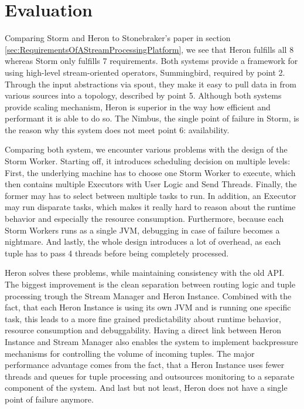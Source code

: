 \documentclass[conference]{IEEEtran}
\begin{document}
\section{Evaluation}
\label{sec:Evaluation}

Comparing Storm and Heron to Stonebraker's paper in section \ref{sec:RequirementsOfAStreamProcessingPlatform}, we see that Heron fulfills all 8 whereas Storm only fulfills 7 requirements.
Both systems provide a framework for using high-level stream-oriented operators, Summingbird, required by point 2.
Through the input abstractions via spout, they make it easy to pull data in from various sources into a topology, described by point 5.
Although both systems provide scaling mechanism, Heron is superior in the way how efficient and performant it is able to do so.
The Nimbus, the single point of failure in Storm, is the reason why this system does not meet point 6: availability.

Comparing both system, we encounter various problems with the design of the Storm Worker.
Starting off, it introduces scheduling decision on multiple levels: First, the underlying machine has to choose one Storm Worker to execute, which then contains multiple Executors with User Logic and Send Threads.
Finally, the former may has to select between multiple tasks to run.
In addition, an Executor may run disparate tasks, which makes it really hard to reason about the runtime behavior and especially the resource consumption.
Furthermore, because each Storm Workers runs as a single JVM, debugging in case of failure becomes a nightmare.
And lastly, the whole design introduces a lot of overhead, as each tuple has to pass 4 threads before being completely processed.

Heron solves these problems, while maintaining consistency with the old API.
The biggest improvement is the clean separation between routing logic and tuple processing trough the Stream Manager and Heron Instance.
Combined with the fact, that each Heron Instance is using its own JVM and is running one specific task, this leads to a more fine grained predictability about runtime behavior, resource consumption and debuggability.
Having a direct link between Heron Instance and Stream Manager also enables the system to implement backpressure mechanisms for controlling the volume of incoming tuples.
The major performance advantage comes from the fact, that a Heron Instance uses fewer threads and queues for tuple processing and outsources monitoring to a separate component of the system.
And last but not least, Heron does not have a single point of failure anymore.  
\end{document}
